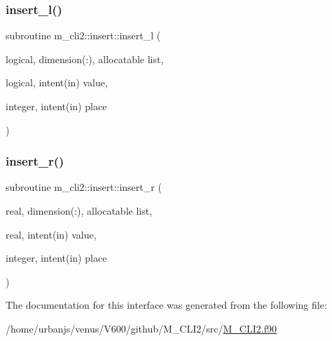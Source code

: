 \subsubsection{\texorpdfstring{insert\+\_\+l()}{insert\_l()}}
{\footnotesize\ttfamily subroutine m\+\_\+cli2\+::insert\+::insert\+\_\+l (\begin{DoxyParamCaption}\item[{logical, dimension(\+:), allocatable}]{list,  }\item[{logical, intent(in)}]{value,  }\item[{integer, intent(in)}]{place }\end{DoxyParamCaption})\hspace{0.3cm}{\ttfamily [private]}}

\mbox{\label{interfacem__cli2_1_1insert_a647342bf6669248878fd990a9d92ef2e}} 
\subsubsection{\texorpdfstring{insert\+\_\+r()}{insert\_r()}}
{\footnotesize\ttfamily subroutine m\+\_\+cli2\+::insert\+::insert\+\_\+r (\begin{DoxyParamCaption}\item[{real, dimension(\+:), allocatable}]{list,  }\item[{real, intent(in)}]{value,  }\item[{integer, intent(in)}]{place }\end{DoxyParamCaption})\hspace{0.3cm}{\ttfamily [private]}}



The documentation for this interface was generated from the following file\+:\begin{DoxyCompactItemize}
\item 
/home/urbanjs/venus/\+V600/github/\+M\+\_\+\+C\+L\+I2/src/\mbox{\hyperlink{M__CLI2_8f90}{M\+\_\+\+C\+L\+I2.\+f90}}\end{DoxyCompactItemize}
